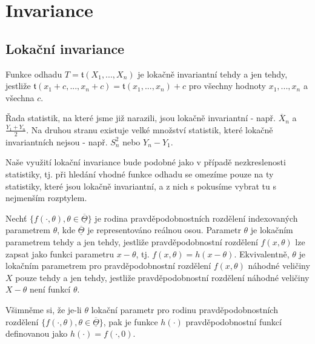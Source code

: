 \section{Invariance}

\subsection{Lokační invariance}

\begin{definition}
Funkce odhadu $T = \mathfrak{t}(X_1, ..., X_n)$ je lokačně invariantní tehdy a jen tehdy, jestliže $\mathfrak{t}(x_1 + c, ..., x_n + c) = \mathfrak{t}(x_1, ..., x_n) + c$ pro všechny hodnoty $x_1, ..., x_n$ a všechna $c$.
\end{definition}

\begin{example}
Řada statistik, na které jsme již narazili, jsou lokačně invariantní - např. $\overline{X}_n$ a $\frac{Y_1 + Y_n}{2}$. Na druhou stranu existuje velké množství statistik, které lokačně invariantních nejsou - např. $S_n^2$ nebo $Y_n - Y_1$.
\end{example}

Naše využití lokační invariance bude podobné jako v případě nezkreslenosti statistiky, tj. při hledání vhodné funkce odhadu se omezíme pouze na ty statistiky, které jsou lokačně invariantní, a z nich s pokusíme vybrat tu s nejmenším rozptylem.

\begin{definition}
Nechť $\{f(\cdot, \theta), \theta \in \overline{\underline{\Theta}}\}$ je rodina pravděpodobnostních rozdělení indexovaných parametrem $\theta$, kde $\overline{\underline{\Theta}}$ je representováno reálnou osou. Parametr $\theta$ je lokačním parametrem tehdy a jen tehdy, jestliže pravděpodobnostní rozdělení $f(x, \theta)$ lze zapsat jako funkci parametru $x - \theta$, tj. $f(x, \theta) = h(x - \theta)$. Ekvivalentně, $\theta$ je lokačním parametrem pro pravděpodobnostní rozdělení $f(x, \theta)$  náhodné veličiny $X$ pouze tehdy a jen tehdy, jestliže pravděpodobnostní rozdělení náhodné veličiny $X - \theta$ není funkcí $\theta$.

Všimněme si, že je-li $\theta$ lokační parametr pro rodinu pravděpodobnostních rozdělení $\{f(\cdot, \theta), \theta \in \overline{\underline{\Theta}}\}$, pak je funkce $h(\cdot)$ pravděpodobnostní funkcí definovanou jako $h(\cdot) = f(\cdot, 0)$.
\end{definition}

